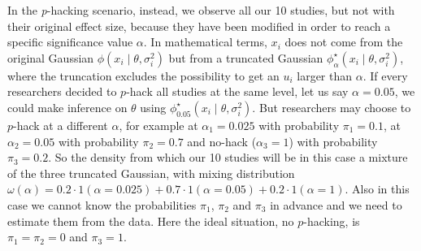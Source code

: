 In the \textit{p}-hacking scenario, instead, we observe all our 10 studies, but not with their original effect size, because they have been modified in order to reach a specific significance value $\alpha$. In mathematical terms, $x_i$ does not come from the original Gaussian $\phi(x_{i}\mid\theta,\sigma^2_{i})$ but from a truncated Gaussian $\phi_\alpha^{\star}(x_{i}\mid\theta,\sigma^2_{i})$, where the truncation excludes the possibility to get an $u_i$ larger than $\alpha$. If every researchers decided to $p$-hack all studies at the same level, let us say $\alpha = 0.05$, we could make inference on $\theta$ using $\phi_{0.05}^{\star}(x_{i}\mid\theta,\sigma^2_{i})$. But researchers may choose to $p$-hack at a different $\alpha$, for example at $\alpha_1 = 0.025$ with probability $\pi_1=  0.1$, at $\alpha_2 = 0.05$ with probability $\pi_2 = 0.7$ and no-hack ($\alpha_3 = 1$) with probability $\pi_3 = 0.2$. So the density from which our 10 studies will be in this case a mixture of the three truncated Gaussian, with mixing distribution $\omega(\alpha) = 0.2 \cdot 1(\alpha = 0.025) + 0.7 \cdot 1(\alpha = 0.05) + 0.2 \cdot 1(\alpha = 1)$. Also in this case we cannot know the probabilities $\pi_1$, $\pi_2$ and $\pi_3$ in advance and we need to estimate them from the data. Here the ideal situation, no $p$-hacking, is $\pi_1 = \pi_2 = 0$ and $\pi_3 = 1$.